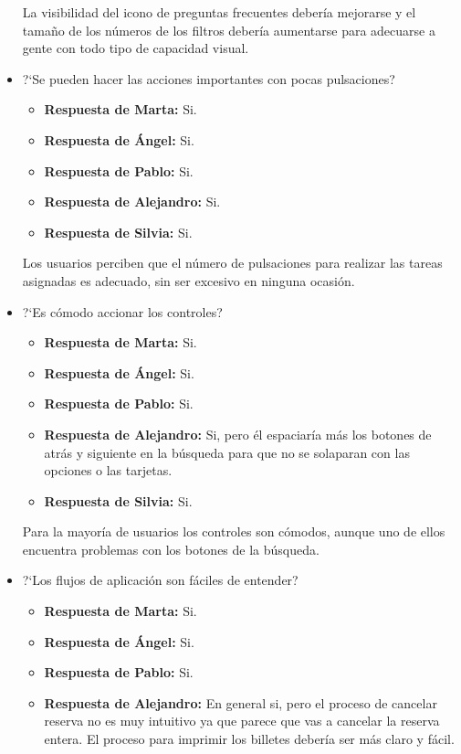 \begin{itemize}
          La visibilidad del icono de preguntas frecuentes debería mejorarse y el tamaño de los números de los filtros debería aumentarse para adecuarse a gente con todo tipo de capacidad visual.
    \item ?`Se pueden hacer las acciones importantes con pocas pulsaciones?
          \begin{itemize}
              \item\textbf{Respuesta de Marta:} Si.
              \item \textbf{Respuesta de Ángel:} Si.
              \item\textbf{Respuesta de Pablo:} Si.
              \item\textbf{Respuesta de Alejandro:} Si.
              \item\textbf{Respuesta de Silvia:} Si.
          \end{itemize}
          Los usuarios perciben que el número de pulsaciones para realizar las tareas asignadas es adecuado, sin ser excesivo en ninguna ocasión.
    \item ?`Es cómodo accionar los controles?
          \begin{itemize}
              \item\textbf{Respuesta de Marta:} Si.
              \item \textbf{Respuesta de Ángel:} Si.
              \item\textbf{Respuesta de Pablo:} Si.
              \item\textbf{Respuesta de Alejandro:} Si, pero él espaciaría más los botones de atrás y siguiente en la búsqueda para que no se solaparan con las opciones o las tarjetas.
              \item\textbf{Respuesta de Silvia:} Si.
          \end{itemize}
          Para la mayoría de usuarios los controles son cómodos, aunque uno de ellos encuentra problemas con los botones de la búsqueda.
    \item ?`Los flujos de aplicación son fáciles de entender?
          \begin{itemize}
              \item\textbf{Respuesta de Marta:} Si.
              \item \textbf{Respuesta de Ángel:} Si.
              \item\textbf{Respuesta de Pablo:} Si.
              \item\textbf{Respuesta de Alejandro:} En general si, pero el proceso de cancelar reserva no es muy intuitivo ya que parece que vas a cancelar la reserva entera. El proceso para imprimir los billetes debería ser más claro y fácil.

\end{itemize}
\end{itemize}
